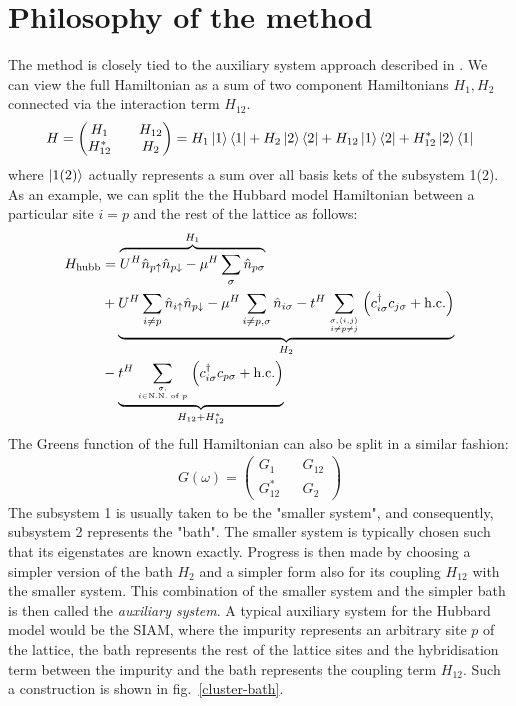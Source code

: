 \documentclass[12pt]{article}
\numberwithin{equation}{section}
\begin{document}
\section{Philosophy of the method}
The method is closely tied to the auxiliary system approach described in \cite{martin_2016}. We can view the full Hamiltonian as a sum of two component Hamiltonians \(H_1, H_2\) connected via the interaction term \(H_{12}\).
\begin{equation}\begin{aligned}
	H = \begin{pmatrix} H_1 && H_{12} \\ H_{12}^* && H_2 \end{pmatrix} = H_1 \ket{1}\bra{1} + H_2\ket{2}\bra{2} + H_{12}\ket{1}\bra{2} + H_{12}^*\ket{2}\bra{1}
\end{aligned}\end{equation}
where \(\ket{1(2)}\) actually represents a sum over all basis kets of the subsystem 1(2). As an example, we can split the the Hubbard model Hamiltonian between a particular site \(i = p\) and the rest of the lattice as follows:
\begin{equation}\begin{aligned}
	H_\text{hubb} &= \overbrace{U^H\hat n_{p \uparrow} \hat n_{p \downarrow} - \mu^H \sum_\sigma \hat n_{p \sigma}}^{H_1} \\
		      &+ \underbrace{U^H\sum_{i \neq p}\hat n_{i \uparrow} \hat n_{p \downarrow} - \mu^H \sum_{i \neq p, \sigma} \hat n_{i \sigma} -t^H\sum_{\sigma,\left<i,j \right>\atop{i \neq p \neq j}}\left(c^\dagger_{i\sigma} c_{j\sigma} + \text{h.c.}\right)}_{H_2}\\
		      & -\underbrace{t^H\sum_{\sigma,\atop{i \in \text{N.N. of }p}}\left(c^\dagger_{i\sigma} c_{p\sigma} + \text{h.c.}\right)}_{H_{12} + H_{12}^*}\\
\end{aligned}\end{equation}
The Greens function of the full Hamiltonian can also be split in a similar fashion:
\begin{equation}\begin{aligned}
	G(\omega) = \begin{pmatrix} G_1 && G_{12} \\ G_{12}^* && G_2 \end{pmatrix} 
\end{aligned}\end{equation}
The subsystem 1 is usually taken to be the "smaller system", and consequently, subsystem 2 represents the "bath". The smaller system is typically chosen such that its eigenstates are known exactly. Progress is then made by choosing a simpler version of the bath \(H_2\) and a simpler form also for its coupling \(H_{12}\) with the smaller system. This combination of the smaller system and the simpler bath is then called the \textit{auxiliary system}. A typical auxiliary system for the Hubbard model would be the SIAM, where the impurity represents an arbitrary site \(p\) of the lattice, the bath represents the rest of the lattice sites and the hybridisation term between the impurity and the bath represents the coupling term \(H_{12}\). Such a construction is shown in fig.~\ref{cluster-bath}.
\end{document}
